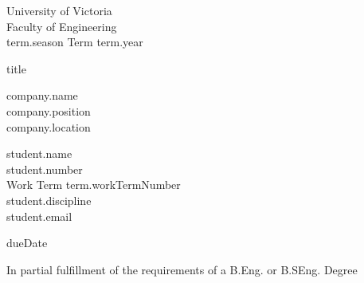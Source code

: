 \begin{center}
  University of Victoria \\
  Faculty of Engineering \\
  {{term.season}} Term {{term.year}} \\ %
  \vspace{1cm}

  {\huge {{title}} }\\
  \vspace{1cm}

  {{company.name}} \\
  {{company.position}} \\
  {{company.location}} \\      %
  \vspace{1cm}

  {{student.name}} \\
  {{student.number}} \\
  Work Term {{term.workTermNumber}} \\                %
  {{student.discipline}} \\
  {{student.email}} \\
  \vspace{1cm}

  {{dueDate}} \\              %
  \vspace{1cm}

  In partial fulfillment of the requirements of a B.Eng. or B.SEng. Degree \\
  \vfill


\end{center}
